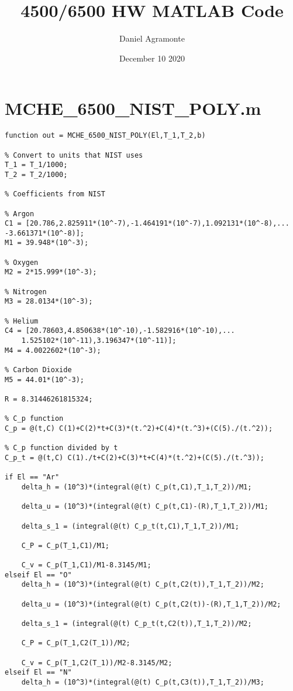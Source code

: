 \documentclass{article}
\title{4500/6500 HW MATLAB Code}
\author{Daniel Agramonte}
\date{December 10 2020}
\begin{document}
\maketitle

\section*{MCHE\_6500\_NIST\_POLY.m}
\begin{lstlisting}[style=Matlab-editor]
function out = MCHE_6500_NIST_POLY(El,T_1,T_2,b)

% Convert to units that NIST uses
T_1 = T_1/1000;
T_2 = T_2/1000;

% Coefficients from NIST

% Argon
C1 = [20.786,2.825911*(10^-7),-1.464191*(10^-7),1.092131*(10^-8),...
-3.661371*(10^-8)];
M1 = 39.948*(10^-3);

% Oxygen
M2 = 2*15.999*(10^-3);

% Nitrogen
M3 = 28.0134*(10^-3);

% Helium
C4 = [20.78603,4.850638*(10^-10),-1.582916*(10^-10),...
    1.525102*(10^-11),3.196347*(10^-11)];
M4 = 4.0022602*(10^-3);

% Carbon Dioxide
M5 = 44.01*(10^-3);

R = 8.31446261815324;

% C_p function
C_p = @(t,C) C(1)+C(2)*t+C(3)*(t.^2)+C(4)*(t.^3)+(C(5)./(t.^2)); 

% C_p function divided by t
C_p_t = @(t,C) C(1)./t+C(2)+C(3)*t+C(4)*(t.^2)+(C(5)./(t.^3));

if El == "Ar"
    delta_h = (10^3)*(integral(@(t) C_p(t,C1),T_1,T_2))/M1;

    delta_u = (10^3)*(integral(@(t) C_p(t,C1)-(R),T_1,T_2))/M1;
    
    delta_s_1 = (integral(@(t) C_p_t(t,C1),T_1,T_2))/M1;
    
    C_P = C_p(T_1,C1)/M1;
    
    C_v = C_p(T_1,C1)/M1-8.3145/M1;
elseif El == "O"
    delta_h = (10^3)*(integral(@(t) C_p(t,C2(t)),T_1,T_2))/M2;

    delta_u = (10^3)*(integral(@(t) C_p(t,C2(t))-(R),T_1,T_2))/M2;
    
    delta_s_1 = (integral(@(t) C_p_t(t,C2(t)),T_1,T_2))/M2;
    
    C_P = C_p(T_1,C2(T_1))/M2;
    
    C_v = C_p(T_1,C2(T_1))/M2-8.3145/M2;
elseif El == "N"
    delta_h = (10^3)*(integral(@(t) C_p(t,C3(t)),T_1,T_2))/M3;


\end{lstlisting}
\end{document}
